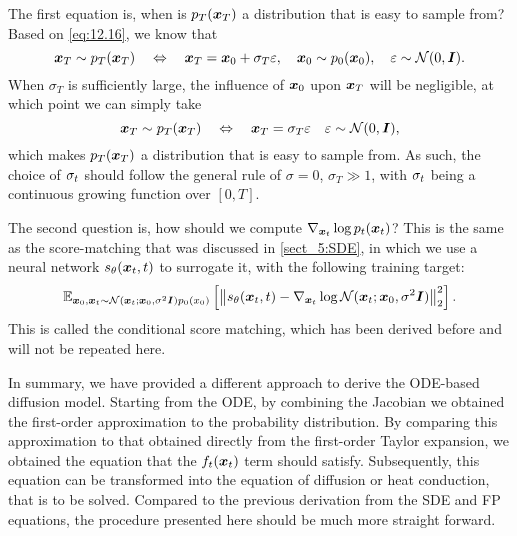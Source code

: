 The first equation is, when is $p_T (\bm{x}_T)$ a distribution that is easy to sample from? Based on \cref{eq:12.16}, we know that 
\begin{equation}
    \label{eq:12.18}
    \bm{x}_T\sim p_T(\bm{x}_T)\quad\Leftrightarrow\quad \bm{x}_T=\bm{x}_0+\sigma_T\varepsilon,\quad \bm{x}_0\sim p_0(\bm{x}_0),\quad \varepsilon\sim\mathcal{N}(0,\bm{I}).
\end{equation}
When $\sigma_T$ is sufficiently large, the influence of $\bm{x}_0$ upon $\bm{x}_T$ will be negligible, at which point we can simply take
\begin{equation}
    \label{eq:12.19}
    \bm{x}_T\sim p_T(\bm{x}_T)\quad\Leftrightarrow\quad \bm{x}_T=\sigma_T\varepsilon\quad \varepsilon\sim\mathcal{N}(0,\bm{I}),
\end{equation}
which makes $p_T(\bm{x}_T)$ a distribution that is easy to sample from. As such, the choice of $\sigma_t$ should follow the general rule of $\sigma=0$, $\sigma_T \gg 1$, with $\sigma_t$ being a continuous growing function over $[0,T]$.

The second question is, how should we compute $\nabla_{\bm{x}_{t}}\log p_t(\bm{x}_{t})$? This is the same as the score-matching that was discussed in \cref{sect_5:SDE}, in which we use a neural network $s_{\theta}(\bm{x}_{t},t)$ to surrogate it, with the following training target:
\begin{equation}
    \label{eq:12.20}
    \mathbb{E}_{\bm{x}_0,\bm{x}_{t}\sim\mathcal{N}(\bm{x}_{t};\bm{x}_0,\sigma^2\bm{I})p_{0}(x_0)}\left[ \left\|  s_{\theta}(\bm{x}_{t},t) - \nabla_{\bm{x}_{t}}\log \mathcal{N}(\bm{x}_{t};\bm{x}_0,\sigma^2\bm{I}) \right\|_2^2 \right].
\end{equation}
This is called the conditional score matching, which has been derived before and will not be repeated here.

In summary, we have provided a different approach to derive the ODE-based diffusion model. Starting from the ODE, by combining the Jacobian we obtained the first-order approximation to the probability distribution. By comparing this approximation to that obtained directly from the first-order Taylor expansion, we obtained the equation that the $f_t(\bm{x}_{t})$ term should satisfy. Subsequently, this equation can be transformed into the equation of diffusion or heat conduction, that is to be solved. Compared to the previous derivation from the SDE and FP equations, the procedure presented here should be much more straight forward.
